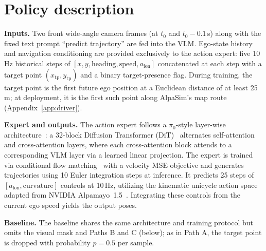 \documentclass{article}
\begin{document}
\section{Policy description}
\label{sec:policy}
\textbf{Inputs.} Two front wide-angle camera frames (at $t_0$ and $t_0{-}0.1$\,s) along with the fixed text prompt ``predict trajectory'' are fed into the VLM. Ego-state history and navigation conditioning are provided exclusively to the action expert: five 10\,Hz historical steps of $[x, y, \mathrm{heading}, \mathrm{speed}, a_\mathrm{lon}]$ concatenated at each step with a target point $(x_\mathrm{tp}, y_\mathrm{tp})$ and a binary target-presence flag. During training, the target point is the first future ego position at a Euclidean distance of at least 25\,m; at deployment, it is the first such point along AlpaSim's map route (Appendix~\ref{app:driver}).

\textbf{Expert and outputs.} The action expert follows a $\pi_0$-style layer-wise architecture~\cite{pi0,drivemoe}: a 32-block Diffusion Transformer (DiT)~\cite{dit} alternates self-attention and cross-attention layers, where each cross-attention block attends to a corresponding VLM layer via a learned linear projection. The expert is trained via conditional flow matching~\cite{flowmatching} with a velocity MSE objective and generates trajectories using 10 Euler integration steps at inference. It predicts 25 steps of $[a_\mathrm{lon}, \mathrm{curvature}]$ controls at 10\,Hz, utilizing the kinematic unicycle action space adapted from NVIDIA Alpamayo~1.5~\cite{alpamayocode,alpamayo}. Integrating these controls from the current ego speed yields the output poses.

\textbf{Baseline.} The baseline shares the same architecture and training protocol but omits the visual mask and Paths B and C (below); as in Path A, the target point is dropped with probability $p=0.5$ per sample.
\end{document}
